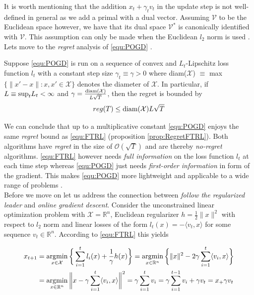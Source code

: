 It is worth mentioning that the addition $x_t + \gamma_t v_t$ in the update step is not well-defined in general as we add a primal with a dual vector. Assuming $\mathcal{V}$ to be the Euclidean space however, we have that its dual space $\mathcal{V}^*$ is canonically identified with $\mathcal{V}$. This assumption can only be made when the Euclidean $l_2$ norm is used \cite{HDRmertikopoulos}. Lets move to the \textit{regret} analysis of \ref{equ:POGD} \cite[Theorem 2.2]{HDRmertikopoulos}.

\begin{proposition}\label{prop:regretPOGD}
    Suppose \ref{equ:POGD} is run on a sequence of convex and $L_t$-Lipschitz loss function $l_t$ with a constant step size $\gamma_t \equiv \gamma > 0$ where  \textnormal{diam}($\mathcal{X}$) $\equiv$ \textnormal{max}$\{\|x'-x\|:x,x' \in \mathcal{X}\}$ denotes the diameter of $\mathcal{X}$. In particular, if $L \equiv \textnormal{sup}_t L_t < \infty$ and $\gamma = \frac{\textnormal{diam}(\mathcal{X})}{L\sqrt{T}}$, then the regret is bounded by 
    \[reg(T) \le \textnormal{diam}(\mathcal{X})L\sqrt{T}\]
\end{proposition}

We can conclude that up to a multiplicative constant \ref{equ:POGD} enjoys the same \textit{regret} bound as \ref{equ:FTRL} (proposition \ref{prop:RegretFTRL}). Both algorithms have \textit{regret} in the size of $\mathcal{O}(\sqrt{T})$ and are thereby \textit{no-regret} algorithms. \ref{equ:FTRL} however needs \textit{full information} on the loss function $l_t$ at each time step whereas \ref{equ:POGD} just needs \textit{first-order information} in form of the gradient. This makes \ref{equ:POGD} more lightweight and applicable to a wide range of problems \cite{HDRmertikopoulos}. \\

Before we move on let us address the connection between \textit{follow the regularized leader} and \textit{online gradient descent}. Consider the unconstrained linear optimization problem with $\mathcal{X} = \mathbb{R}^n$, Euclidean regularizer $h = \frac{1}{2}\|x\|^2$ with respect to $l_2$ norm and linear losses of the form $l_t(x) = -\langle v_t,x\rangle$ for some sequence $v_t \in \mathbb{R}^n$. According to \ref{equ:FTRL} this yields

\begin{equation*}
    \begin{split}
        x_{t+1} & = \operatorname*{\arg\!\min}_{x \in \mathcal{X}} \bigg\{\sum_{i=1}^t l_i(x) + \frac{1}{\gamma}h(x)\bigg\} = \operatorname*{\arg\!\min}_{x \in \mathbb{R}^n} \bigg\{\|x\|^2 - 2\gamma\sum_{i=1}^t \langle v_i,x\rangle\bigg\} \\
        & = \operatorname*{\arg\!\min}_{x \in \mathbb{R}^n} \bigg\|x - \gamma\sum_{i=1}^t \langle v_i,x\rangle\bigg\|^2 = \gamma\sum_{i=1}^t v_i = \gamma\sum_{i=1}^{t-1} v_i + \gamma v_t = x_ + \gamma v_t
    \end{split}
\end{equation*}

